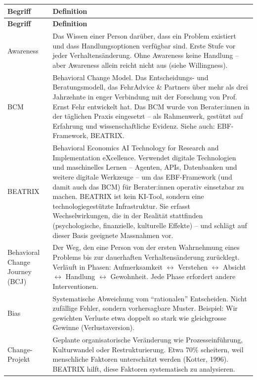 \documentclass[11pt,a4paper]{article}
\begin{document}
\begin{longtable}{@{}L{4cm}L{10cm}@{}}
\toprule
\textbf{Begriff} & \textbf{Definition} \\
\midrule
\endfirsthead
\toprule
\textbf{Begriff} & \textbf{Definition} \\
\midrule
\endhead

Awareness & Das Wissen einer Person darüber, dass ein Problem existiert und dass Handlungsoptionen verfügbar sind. Erste Stufe vor jeder Verhaltensänderung. Ohne Awareness keine Handlung -- aber Awareness allein reicht nicht aus (siehe Willingness). \\
\midrule
BCM & Behavioral Change Model. Das Entscheidungs- und Beratungsmodell, das FehrAdvice \& Partners über mehr als drei Jahrzehnte in enger Verbindung mit der Forschung von Prof. Ernst Fehr entwickelt hat. Das BCM wurde von Berater:innen in der täglichen Praxis eingesetzt -- als Rahmenwerk, gestützt auf Erfahrung und wissenschaftliche Evidenz. Siehe auch: EBF-Framework, BEATRIX. \\
\midrule
BEATRIX & Behavioral Economics AI Technology for Research and Implementation eXcellence. Verwendet digitale Technologien und maschinelles Lernen -- Agenten, APIs, Datenbanken und weitere digitale Werkzeuge -- um das EBF-Framework (und damit auch das BCM) für Berater:innen operativ einsetzbar zu machen. BEATRIX ist kein KI-Tool, sondern eine technologiegestützte Infrastruktur. Sie erfasst Wechselwirkungen, die in der Realität stattfinden (psychologische, finanzielle, kulturelle Effekte) -- und schlägt auf dieser Basis geeignete Massnahmen vor. \\
\midrule
Behavioral Change Journey (BCJ) & Der Weg, den eine Person von der ersten Wahrnehmung eines Problems bis zur dauerhaften Verhaltensänderung zurücklegt. Verläuft in Phasen: Aufmerksamkeit $\leftrightarrow$ Verstehen $\leftrightarrow$ Absicht $\leftrightarrow$ Handlung $\leftrightarrow$ Gewohnheit. Jede Phase erfordert andere Interventionen. \\
\midrule
Bias & Systematische Abweichung vom ``rationalen'' Entscheiden. Nicht zufällige Fehler, sondern vorhersagbare Muster. Beispiel: Wir gewichten Verluste etwa doppelt so stark wie gleichgrosse Gewinne (Verlustaversion). \\
\midrule
Change-Projekt & Geplante organisatorische Veränderung wie Prozesseinführung, Kulturwandel oder Restrukturierung. Etwa 70\% scheitern, weil menschliche Faktoren unterschätzt werden (Kotter, 1996). BEATRIX hilft, diese Faktoren systematisch zu analysieren. \\

\end{longtable}
\end{document}
